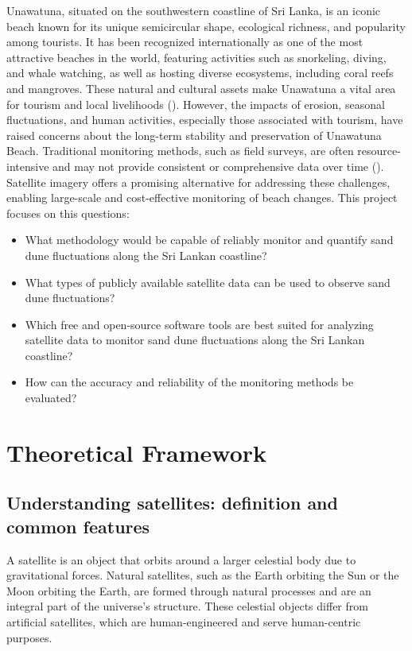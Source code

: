 \documentclass[a4paper,12pt]{article}
\begin{document}
Unawatuna, situated on the southwestern coastline of Sri Lanka, is an iconic beach known for its unique semicircular shape, ecological richness, and popularity among tourists. It has been recognized internationally as one of the most attractive beaches in the world, featuring activities such as snorkeling, diving, and whale watching, as well as hosting diverse ecosystems, including coral reefs and mangroves. These natural and cultural assets make Unawatuna a vital area for tourism and local livelihoods  (\cite{rathnayake_negative_2015}). 
However, the impacts of erosion, seasonal fluctuations, and human activities, especially those associated with tourism, have raised concerns about the long-term stability and preservation of Unawatuna Beach. Traditional monitoring methods, such as field surveys, are often resource-intensive and may not provide consistent or comprehensive data over time (\cite{silveira_optimizing_2013}). Satellite imagery offers a promising alternative for addressing these challenges, enabling large-scale and cost-effective monitoring of beach changes.
\vspace{0.5cm}
This project focuses on this questions:
\begin{itemize}
    \item What methodology would be capable of reliably monitor and quantify sand dune
    fluctuations along the Sri Lankan coastline?
    \item What types of publicly available satellite data can be used to observe sand dune fluctuations?
    \item Which free and open-source software tools are best suited for analyzing satellite data to monitor sand dune fluctuations along the Sri Lankan coastline?
    \item How can the accuracy and reliability of the monitoring methods be evaluated?
\end{itemize}

 
\newpage
\section{Theoretical Framework}
\subsection{Understanding satellites: definition and common features}
A satellite is an object that orbits around a larger celestial body due to gravitational forces. Natural satellites, such as the Earth orbiting the Sun or the Moon orbiting the Earth, are formed through natural processes and are an integral part of the universe’s structure. These celestial objects differ from artificial satellites, which are human-engineered and serve human-centric purposes.  
\end{document}
